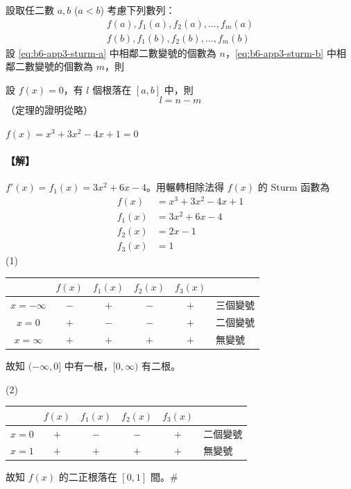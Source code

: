 設取任二數 $a, b$ ($a < b$) 考慮下列數列：
\begin{align}
f(a), f_1(a), f_2(a), \dots, f_m(a) \label{eq:b6-app3-sturm-a} \\
f(b), f_1(b), f_2(b), \dots, f_m(b) \label{eq:b6-app3-sturm-b}
\end{align}
設 \eqref{eq:b6-app3-sturm-a} 中相鄰二數變號的個數為 $n$，\eqref{eq:b6-app3-sturm-b} 中相鄰二數變號的個數為 $m$，則

\begin{theorem}[Sturm 定理]\label{thm:b6-app3-sturm}
設 $f(x)=0$，有 $l$ 個根落在 $[a, b]$ 中，則
\[ l = n - m \]
（定理的證明從略）
\end{theorem}

\begin{example}\label{ex:b6-app3-3}
$f(x) = x^3 + 3x^2 - 4x + 1 = 0$
\end{example}

\paragraph{【解】}
$f'(x) = f_1(x) = 3x^2 + 6x - 4$。用輾轉相除法得 $f(x)$ 的 Sturm 函數為
\begin{align*}
f(x) &= x^3 + 3x^2 - 4x + 1 \\
f_1(x) &= 3x^2 + 6x - 4 \\
f_2(x) &= 2x - 1 \\
f_3(x) &= 1
\end{align*}
(1)
\begin{center}
\renewcommand{\arraystretch}{1.3}
\begin{tabular}{c|c|c|c|c|l}
& $f(x)$ & $f_1(x)$ & $f_2(x)$ & $f_3(x)$ & \\
\hline
$x = -\infty$ & $-$ & $+$ & $-$ & $+$ & 三個變號 \\
$x = 0$       & $+$ & $-$ & $-$ & $+$ & 二個變號 \\
$x = \infty$  & $+$ & $+$ & $+$ & $+$ & 無變號
\end{tabular}
\end{center}
故知 $(-\infty, 0]$ 中有一根，$[0, \infty)$ 有二根。

(2)
\begin{center}
\renewcommand{\arraystretch}{1.3}
\begin{tabular}{c|c|c|c|c|l}
& $f(x)$ & $f_1(x)$ & $f_2(x)$ & $f_3(x)$ & \\
\hline
$x = 0$ & $+$ & $-$ & $-$ & $+$ & 二個變號 \\
$x = 1$ & $+$ & $+$ & $+$ & $+$ & 無變號
\end{tabular}
\end{center}
故知 $f(x)$ 的二正根落在 $[0, 1]$ 間。\hfill$\#$
